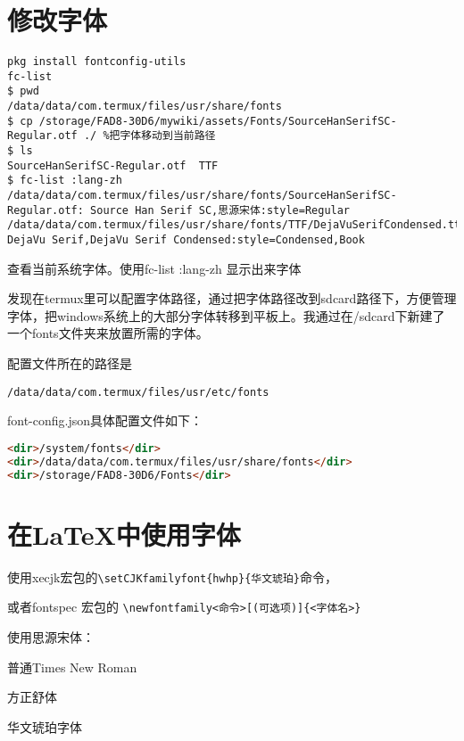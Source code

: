\section{修改字体}

\begin{lstlisting}
pkg install fontconfig-utils
fc-list
$ pwd
/data/data/com.termux/files/usr/share/fonts
$ cp /storage/FAD8-30D6/mywiki/assets/Fonts/SourceHanSerifSC-Regular.otf ./ %把字体移动到当前路径
$ ls
SourceHanSerifSC-Regular.otf  TTF
$ fc-list :lang-zh
/data/data/com.termux/files/usr/share/fonts/SourceHanSerifSC-Regular.otf: Source Han Serif SC,思源宋体:style=Regular
/data/data/com.termux/files/usr/share/fonts/TTF/DejaVuSerifCondensed.ttf: DejaVu Serif,DejaVu Serif Condensed:style=Condensed,Book
\end{lstlisting}
查看当前系统字体。使用fc-list :lang-zh
显示出来字体

发现在termux里可以配置字体路径，通过把字体路径改到sdcard路径下，方便管理字体，把windows系统上的大部分字体转移到平板上。我通过在/sdcard下新建了一个fonts文件夹来放置所需的字体。

配置文件所在的路径是

\verb|/data/data/com.termux/files/usr/etc/fonts|

font-config.json具体配置文件如下：
\begin{lstlisting}[language=html]
<dir>/system/fonts</dir>
<dir>/data/data/com.termux/files/usr/share/fonts</dir>
<dir>/storage/FAD8-30D6/Fonts</dir>
\end{lstlisting}

\section{在\LaTeX 中使用字体}

使用xecjk宏包的\verb'\setCJKfamilyfont{hwhp}{华文琥珀}'命令，

或者fontspec 宏包的 \verb|\newfontfamily<命令>[(可选项)]{<字体名>}|

使用思源宋体：%

普通Times New Roman



{ 方正舒体}

{ 华文琥珀字体}
